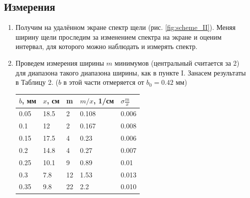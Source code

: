 \documentclass[a4paper, 12pt]{article}
\begin{document}
\subsection*{Измерения}

\begin{enumerate}
    \item Получим на удалённом экране спектр щели (рис. \ref{fig:scheme_II}). Меняя ширину щели проследим за изменением спектра на экране и оценим интервал, для которого можно наблюдать и измерять спектр.
    \item Проведем измерения ширины $m$ минимумов (центральный считается за 2) для диапазона такого диапазона ширины, как в пункте I. Занасем результаты в Таблицу 2. ($b$ в этой части отмеряется от $b_0 = 0.42$ мм)
    
    \begin{minipage}{0.5\textwidth}
        \begin{tabular}{|lllll|}
        \hline
        \multicolumn{1}{|l|}{$b$, мм} & \multicolumn{1}{l|}{$x$, см} & \multicolumn{1}{l|}{m} & \multicolumn{1}{l|}{$m/x$, 1/см} & $\sigma \frac{m}{x}$ \\ \hline
        0.05                          & 18.5                         & 2                      & 0.108                            & 0.006                 \\ \hline
        0.1                           & 12                           & 2                      & 0.167                            & 0.008                 \\ \hline
        0.15                          & 17.5                         & 4                      & 0.23                             & 0.006                 \\ \hline
        0.2                           & 14.8                         & 4                      & 0.27                             & 0.007                 \\ \hline
        0.25                          & 10.1                         & 9                      & 0.89                             & 0.01                 \\ \hline
        0.3                           & 7.8                          & 12                     & 1.53                             & 0.013                 \\ \hline
        0.35                          & 9.8                          & 22                     & 2.2                              & 0.010                 \\ \hline

\end{tabular}
\end{minipage}
\end{enumerate}
\end{document}
